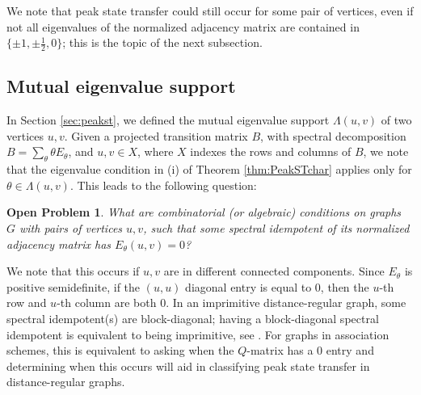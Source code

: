 \documentclass{article}
\newtheorem{openprob}[theorem]{Open Problem}
\numberwithin{equation}{section}
\begin{document}
We note that peak state transfer could still occur for some pair of vertices, even if not all eigenvalues of the normalized adjacency matrix are contained in $\{\pm 1, \pm \frac{1}{2},0\}$; this is the topic of the next subsection. 

\subsection*{Mutual eigenvalue support}

In Section \ref{sec:peakst}, we defined the mutual eigenvalue support $\Lambda(u,v)$ of two vertices $u,v$. Given a projected transition matrix $B$, with spectral decomposition $B= \sum_{\theta} \theta E_{\theta}$, and $u,v \in X$, where $X$ indexes the rows and columns of $B$, we note that the eigenvalue condition in (i) of Theorem \ref{thm:PeakSTchar} applies only for $\theta \in \Lambda(u,v)$. This leads to the following question:

\begin{openprob}
   What are combinatorial (or algebraic) conditions on graphs $G$ with pairs of vertices $u,v$, such that some spectral idempotent of its normalized adjacency matrix has $E_{\theta}(u,v) =0$?
\end{openprob}

We note that this occurs if $u,v$ are in different connected components. 
Since $E_{\theta}$ is positive semidefinite, if the $(u,u)$ diagonal entry is equal to $0$, then the $u$-th row and $u$-th column are both $0$. In an imprimitive distance-regular graph, some spectral idempotent(s) are block-diagonal; having a block-diagonal spectral idempotent is equivalent to being imprimitive, see \cite{MarMuzWil2007}. For graphs in association schemes, this is equivalent to asking when the $Q$-matrix has a $0$ entry and determining when this occurs will aid in classifying peak state transfer in distance-regular graphs. 








\end{document}
